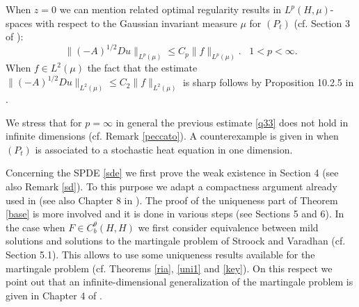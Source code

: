\documentclass[preprint]{imsart}
\def\R{\mathbb R}
\begin{document}

When $z=0$ we can mention  related optimal   regularity results   in $L^p(H, \mu)$-spaces with respect to the Gaussian invariant measure $\mu$ for $(P_t)$ (cf. Section 3 of \cite{CG1}):  
      \begin{equation}  \label{q33}
\|(-A)^{1/2}D u\|_{L^{p}(\mu)} \le C_p \|f\|_{L^p(\mu)}.    
\;\;\; 1 < p < \infty.
\end{equation}
 When   $f \in L^2(\mu)$ the fact that  the estimate  $\|(-A)^{1/2}D u\|_{L^{2}(\mu)} \le C_2 \|f\|_{L^2(\mu)}$ is sharp follows by   
  Proposition 10.2.5 in \cite{DZ1}.  

We stress that for $p=\infty$ in general  the previous estimate \eqref{q33}  does not hold in infinite dimensions (cf. 
 Remark \ref{peccato}). A counterexample is given in \cite{doleraP} when $(P_t)$ is  associated to a  stochastic heat equation in one dimension.  
   

 
Concerning the SPDE \eqref{sde}  we first prove   the weak existence in Section 4 (see also Remark \ref{sd}).
To this purpose we adapt a compactness argument already used in \cite{GG}  (see also Chapter 8 in \cite{DZ}).
The proof of the uniqueness part of Theorem \ref{base} is more involved and it is done in various steps (see Sections 5 and 6). In the case when $F \in C_b^{\theta}(H,H)$ we first  consider   equivalence between mild solutions and solutions to the martingale problem  of Stroock and Varadhan \cite{SV79}     (cf. Section 5.1). This allows to use some  uniqueness results available for the martingale problem (cf. Theorems \ref{ria}, \ref{uni1} and \ref{key}).  On this respect we point out that an infinite-dimensional generalization of the martingale problem is   given in Chapter 4 of \cite{EK}. 
  
\end{document}
